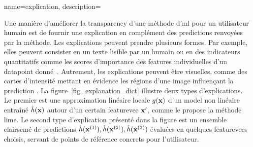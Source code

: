 {name={explication},
	description={
		Une manière d’améliorer la \gls{transparency} d’une méthode d'\gls{ml} pour un utilisateur humain 
		est de fournir une explication en complément des \glspl{prediction} renvoyées par la méthode. 
		Les explications peuvent prendre plusieurs formes. Par exemple, elles peuvent consister en un texte lisible 
		par un humain ou en des indicateurs quantitatifs comme les scores d’importance des \glspl{feature} 
		individuelles d’un \gls{datapoint} donné~\cite{Molnar2019}. 
		Autrement, les explications peuvent être visuelles, comme des cartes d’intensité mettant en évidence 
		les régions d’une image influençant la \gls{prediction} \cite{GradCamPaper}. 
		La figure~\ref{fig_explanation_dict} illustre deux types d’explications. Le premier est une approximation linéaire 
		locale $g({\bf x})$ d’un \gls{model} non linéaire entraîné $\hat{h}({\bf x})$ autour d’un certain 
		\gls{featurevec} ${\bf x}'$, comme le propose la méthode \gls{lime}. Le second type d’explication présenté 
		dans la figure est un ensemble clairsemé de \glspl{prediction} 
		$\hat{h}({\bf x}^{(1)}), \hat{h}({\bf x}^{(2)}), \hat{h}({\bf x}^{(3)})$ 
		évaluées en quelques \glspl{featurevec} choisis, servant de points de référence concrets pour l’utilisateur. 
		\begin{figure}[htbp]
			\begin{center}
\end{center}
\end{figure}}}
